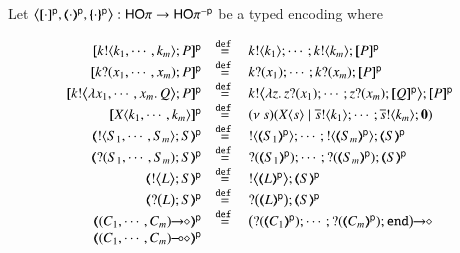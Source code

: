 \begin{definition}\label{d:enc:poltomon}
Let 
$\enco{\map{\cdot}^{\mathsf{p}}, \mapt{\cdot}^{\mathsf{p}}, \mapa{\cdot}^{\mathsf{p}}}: \HOp \to \HOp^{-\mathsf{p}}$
be a typed encoding where
\begin{figure}[t]
\[
	\begin{array}{rcl}
		\map{\bout{k}{k_1, \cdots, k_m} P}^{\mathsf{p}}
		&\defeq&
		\bout{k}{k_1} \cdots ;  \bout{k}{k_m} \map{P}^{\mathsf{p}}
		\\
			\map{\binp{k}{x_1, \cdots, x_m} P}^{\mathsf{p}}
		&\defeq&
		\binp{k}{x_1} \cdots ; \binp{k}{x_m}  \map{P}^{\mathsf{p}}
		\\
		\map{\bbout{k}{\abs{x_1, \cdots, x_m} Q} P}^{\mathsf{p}}
		&\defeq&
		\bbout{k}{\abs{z}\binp{z}{x_1} \cdots ; \binp{z}{x_m} \map{Q}^{\mathsf{p}}} \map{P}^{\mathsf{p}}
		\\ 
		\map{\appl{X}{k_1, \cdots, k_m}}^{\mathsf{p}}
		&\defeq&
		\newsp{s}{\appl{X}{s} \Par \bout{\dual{s}}{k_1} \cdots ; \bout{\dual{s}}{k_m} \inact} 
        \\ %
		\tmap{\btout{S_1, \cdots, S_m}S}{\mathsf{p}}
		&\defeq&
		\btout{\tmap{S_1}{\mathsf{p}}} \cdots ; \btout{\tmap{S_m}{\mathsf{p}}}\tmap{S}{\mathsf{p}}
		\\
		\tmap{\btinp{S_1, \cdots, S_m}S}{\mathsf{p}}
		&\defeq&
		\btinp{\tmap{S_1}{\mathsf{p}}} \cdots ; \btinp{\tmap{S_m}{\mathsf{p}}}\tmap{S}{\mathsf{p}}
		\\
		\tmap{\bbtout{L} S}{\mathsf{p}}
		&\defeq&
		\bbtout{\mapt{L}^{\mathsf{p}}}\mapt{S}^{\mathsf{p}}
		\\
		\tmap{\bbtinp{L} S}{\mathsf{p}}
		&\defeq&
		\bbtinp{\mapt{L}^{\mathsf{p}}}\mapt{S}^{\mathsf{p}}
		\\
		\tmap{\shot{(C_1, \cdots, C_m)}}{\mathsf{p}}
		&\defeq&
		\shot{\big(\btinp{\tmap{C_1}{\mathsf{p}}} \cdots; \btinp{\tmap{C_m}{\mathsf{p}}}\tinact\big)}
		\\
		\tmap{\lhot{(C_1, \cdots, C_m)}}{\mathsf{p}}

\end{array}\]
\end{figure}
\end{definition}
